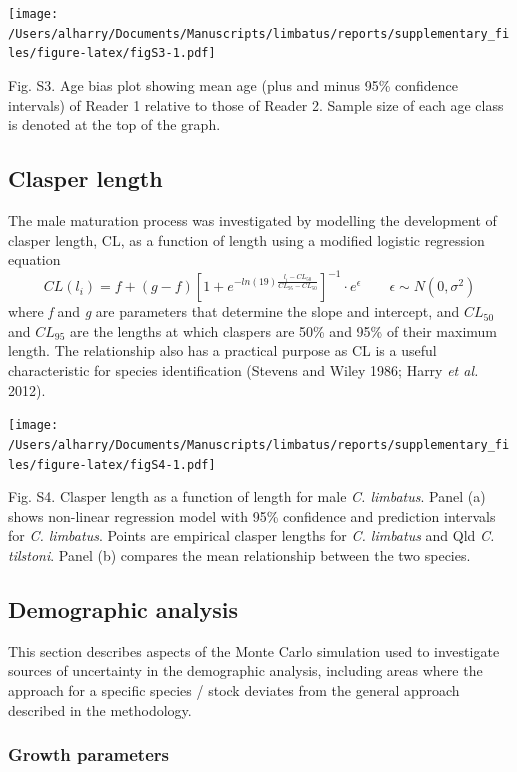 \documentclass[]{article}
\begin{document}
\newpage

\texttt{[image: /Users/alharry/Documents/Manuscripts/limbatus/reports/supplementary\_files/figure-latex/figS3-1.pdf]}

Fig. S3. Age bias plot showing mean age (plus and minus 95\% confidence
intervals) of Reader 1 relative to those of Reader 2. Sample size of
each age class is denoted at the top of the graph.

\newpage

\subsection{Clasper length}\label{clasper-length}

The male maturation process was investigated by modelling the
development of clasper length, CL, as a function of length using a
modified logistic regression equation
\[ CL(l_i) = f + (g-f)[1+e^{-ln(19)\frac{l_i - CL_{50}}{CL_{95}-CL_{50}}}]^{-1}\cdot e^{\epsilon} \quad \quad \epsilon \sim N(0,\sigma^2)\]
where \emph{f} and \emph{g} are parameters that determine the slope and
intercept, and \(CL_{50}\) and \(CL_{95}\) are the lengths at which
claspers are 50\% and 95\% of their maximum length. The relationship
also has a practical purpose as CL is a useful characteristic for
species identification (Stevens and Wiley 1986; Harry \emph{et al.}
2012).

\texttt{[image: /Users/alharry/Documents/Manuscripts/limbatus/reports/supplementary\_files/figure-latex/figS4-1.pdf]}

Fig. S4. Clasper length as a function of length for male \emph{C.
limbatus}. Panel (a) shows non-linear regression model with 95\%
confidence and prediction intervals for \emph{C. limbatus}. Points are
empirical clasper lengths for \emph{C. limbatus} and Qld \emph{C.
tilstoni}. Panel (b) compares the mean relationship between the two
species.

\subsection{Demographic analysis}\label{demographic-analysis}

This section describes aspects of the Monte Carlo simulation used to
investigate sources of uncertainty in the demographic analysis,
including areas where the approach for a specific species / stock
deviates from the general approach described in the methodology.

\subsubsection{Growth parameters}\label{growth-parameters}
\end{document}
